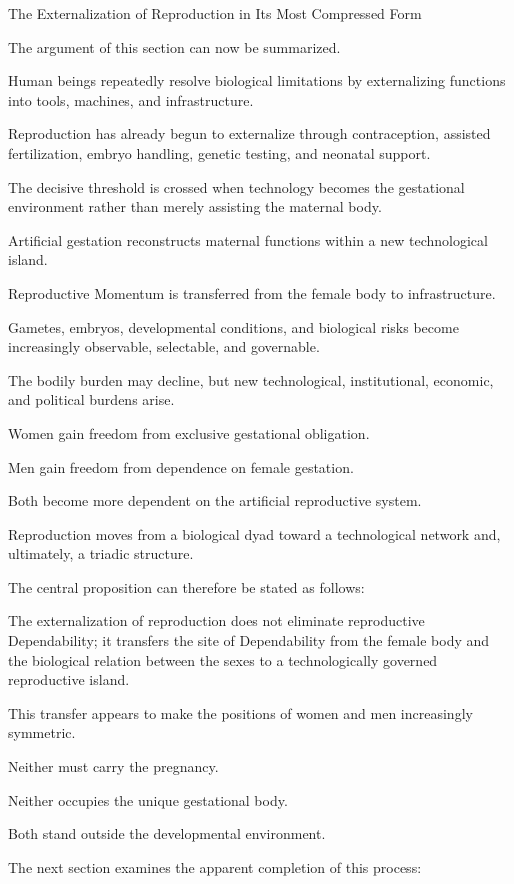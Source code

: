 The Externalization of Reproduction in Its Most Compressed Form

The argument of this section can now be summarized.

Human beings repeatedly resolve biological limitations by externalizing functions into tools, machines, and infrastructure.

Reproduction has already begun to externalize through contraception, assisted fertilization, embryo handling, genetic testing, and neonatal support.

The decisive threshold is crossed when technology becomes the gestational environment rather than merely assisting the maternal body.

Artificial gestation reconstructs maternal functions within a new technological island.

Reproductive Momentum is transferred from the female body to infrastructure.

Gametes, embryos, developmental conditions, and biological risks become increasingly observable, selectable, and governable.

The bodily burden may decline, but new technological, institutional, economic, and political burdens arise.

Women gain freedom from exclusive gestational obligation.

Men gain freedom from dependence on female gestation.

Both become more dependent on the artificial reproductive system.

Reproduction moves from a biological dyad toward a technological network and, ultimately, a triadic structure.

The central proposition can therefore be stated as follows:

The externalization of reproduction does not eliminate reproductive Dependability; it transfers the site of Dependability from the female body and the biological relation between the sexes to a technologically governed reproductive island.

This transfer appears to make the positions of women and men increasingly symmetric.

Neither must carry the pregnancy.

Neither occupies the unique gestational body.

Both stand outside the developmental environment.

The next section examines the apparent completion of this process:


